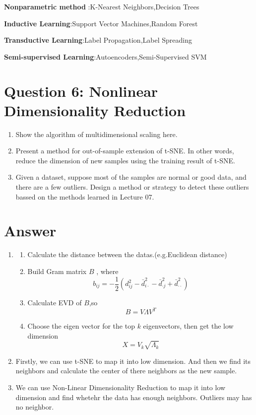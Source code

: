 \documentclass[
	12pt, %
]{fphw}
\begin{document}
\begin{enumerate}
\textbf{Nonparametric method }:K-Nearest Neighbors,Decision Trees

\textbf{Inductive Learning}:Support Vector Machines,Random Forest

\textbf{Transductive Learning}:Label Propagation,Label Spreading

\textbf{Semi-supervised Learning}:Autoencoders,Semi-Supervised SVM
\end{enumerate}


\section*{Question 6: Nonlinear Dimensionality Reduction}

\begin{problem}
	\begin{enumerate}
	\item Show the algorithm of multidimensional scaling here. 
    
    \item Present a method for out-of-sample extension of t-SNE. In other words, reduce the dimension of new samples using the training result of t-SNE. 
    
    \item Given a dataset, suppose most of the samples are normal or good data, and there are a few outliers. Design a method or strategy to detect these outliers bassed on the methods learned in Lecture 07.
\end{enumerate}
\end{problem}
\section*{Answer}
\begin{enumerate}
\item \begin{enumerate}[$\bullet$]
\item  Calculate the distance between the datas.(e.g.Euclidean distance)
\item  Build Gram matrix $B$ , where \[
	b_{ij} = -\frac{1}{2}(d_{ij}^2 - \bar{d}_{i\cdot}^2 - \bar{d}_{\cdot j}^2 + \bar{d}_{\cdot\cdot}^2)
	\]
\item Calculate EVD of $B$,so \[
	B = V \Lambda V^T
	\]
\item Choose the eigen vector for the top $k$ eigenvectors, then get the low dimension \[
	X = V_k \sqrt{\Lambda_k}
	\]
\end{enumerate}
\item Firstly, we can use t-SNE to map it into low dimension. And then we find its neighbors and calculate the center of there neighbors as the new sample.
\item We can use Non-Linear Dimensionality Reduction to map it into low dimension and find whetehr the data has enough neighbors. Outliers may has no neighbor.

\end{enumerate}
\end{document}
